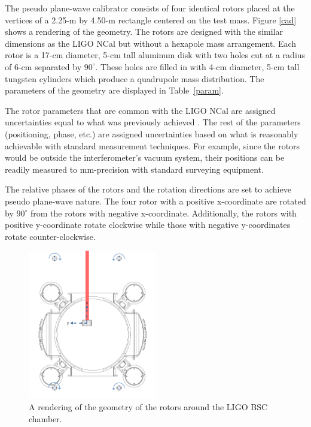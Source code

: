 \documentclass[superscriptaddress, twocolumn, prd]{revtex4-1}
\begin{document}
The pseudo plane-wave calibrator consists of four identical rotors placed at the vertices of a 2.25-m by 4.50-m rectangle centered on the test mass. Figure \ref{cad} shows a rendering of the geometry. The rotors are designed with the similar dimensions as the LIGO NCal \cite{ncal} but without a hexapole mass arrangement. Each rotor is a 17-cm diameter, 5-cm tall aluminum disk with two holes cut at a radius of 6-cm separated by $90^\circ$. These holes are filled in with 4-cm diameter, 5-cm tall  tungsten cylinders which produce a quadrupole mass distribution. The parameters of the geometry are displayed in Table~\ref{param}.

The rotor parameters that are common with the LIGO NCal are assigned uncertainties equal to what was previously achieved \cite{ncal}. The rest of the parameters (positioning, phase, etc.) are assigned uncertainties based on what is reasonably achievable with standard measurement techniques. For example, since the rotors would be outside the interferometer's vacuum system, their positions can be readily measured to  mm-precision with standard surveying equipment. \cite{ncal}

The relative phases of the rotors and the rotation directions are set to achieve pseudo plane-wave nature. The four rotor with a positive x-coordinate are rotated by $90^\circ$ from the rotors with negative x-coordinate. Additionally, the rotors with positive y-coordinate rotate clockwise while those with negative y-coordinates rotate counter-clockwise. 

\begin{figure}[!h]
\centering \includegraphics[width=0.5\textwidth]{Super4BSCTopDownAxesSpinNew.pdf}
\caption{A rendering of the geometry of the rotors around the LIGO BSC chamber.}
\label{bsc} 
\end{figure}
\end{document}

